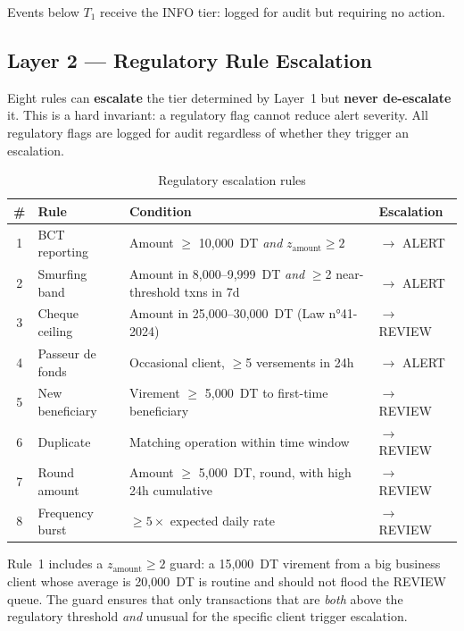 Events below $T_1$ receive the INFO tier: logged for audit but requiring no action.

\subsection{Layer 2 --- Regulatory Rule Escalation}

Eight rules can \textbf{escalate} the tier determined by Layer~1 but
\textbf{never de-escalate} it. This is a hard invariant: a regulatory flag cannot
reduce alert severity. All regulatory flags are logged for audit regardless of
whether they trigger an escalation.

\begin{table}[H]
\centering
\caption{Regulatory escalation rules}
\label{tab:regulatory-rules}
\begin{tabular}{@{}clp{7cm}l@{}}
\toprule
\textbf{\#} & \textbf{Rule} & \textbf{Condition} & \textbf{Escalation} \\
\midrule
1 & BCT reporting     & Amount $\geq$ 10,000~DT \textit{and} $z_{\text{amount}} \geq 2$ & $\rightarrow$ ALERT \\
2 & Smurfing band     & Amount in 8,000--9,999~DT \textit{and} $\geq$2 near-threshold txns in 7d & $\rightarrow$ ALERT \\
3 & Cheque ceiling    & Amount in 25,000--30,000~DT (Law n°41-2024) & $\rightarrow$ REVIEW \\
4 & Passeur de fonds  & Occasional client, $\geq$5 versements in 24h & $\rightarrow$ ALERT \\
5 & New beneficiary   & Virement $\geq$ 5,000~DT to first-time beneficiary & $\rightarrow$ REVIEW \\
6 & Duplicate         & Matching operation within time window & $\rightarrow$ REVIEW \\
7 & Round amount      & Amount $\geq$ 5,000~DT, round, with high 24h cumulative & $\rightarrow$ REVIEW \\
8 & Frequency burst   & $\geq 5\times$ expected daily rate & $\rightarrow$ REVIEW \\
\bottomrule
\end{tabular}
\end{table}

Rule~1 includes a $z_{\text{amount}} \geq 2$ guard: a 15,000~DT virement from a big
business client whose average is 20,000~DT is routine and should not flood the REVIEW
queue. The guard ensures that only transactions that are \textit{both} above the
regulatory threshold \textit{and} unusual for the specific client trigger escalation.

